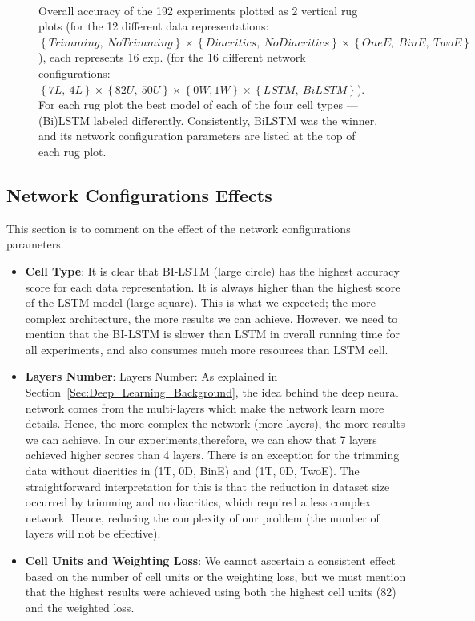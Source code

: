 {\begin{figure}[!t]
 
 \caption{Overall accuracy of the 192 experiments plotted as 2 vertical rug plots (for the 12 different data representations: $\left\{\mathit{Trimming},\ \mathit{No Trimming} \right\} \times \left\{\mathit{Diacritics},\ \mathit{No Diacritics} \right\} \times \left\{\mathit{OneE},\ \mathit{BinE},\ \mathit{TwoE}\right\}$), each represents 16 exp. (for the 16 different network configurations: $\left\{7L,\ 4L\right\} \times \left\{82U,\ 50U\right\} \times \left\{0W, 1W\right\} \times \left\{LSTM,\ BiLSTM\right\}$). For each rug plot the best model of each of the four cell types ---(Bi)LSTM labeled differently. Consistently, BiLSTM was the winner, and its network configuration parameters are listed at the top of each rug plot.}~\label{Fig:ArabicModelsResults}
\end{figure}



\subsection{Network Configurations Effects}

This section is to comment on the effect of the network configurations parameters.
\begin{itemize}

\item \textbf{Cell Type}: It is clear that BI-LSTM (large circle) has the highest accuracy score for each data representation. It is always higher than the highest score of the LSTM model (large square). This is what we expected; the more complex architecture, the more results we can achieve. However, we need to mention that the BI-LSTM is slower than LSTM in overall running time for all experiments, and also consumes much more resources than LSTM cell.
\item \textbf{Layers Number}: Layers Number: As explained in Section~\ref{Sec:Deep_Learning_Background}, the idea behind the deep neural network comes from the multi-layers which make the network learn more details. Hence, the more complex the network (more layers), the more results we can achieve. In our experiments,therefore, we can show that 7 layers achieved higher scores than 4 layers. There is an exception for the trimming data without diacritics in (1T, 0D, BinE) and (1T, 0D, TwoE). The straightforward interpretation for this is that the reduction in dataset size occurred by trimming and no diacritics, which required a less complex network. Hence, reducing the complexity of our problem (the number of layers will not be effective).
\item \textbf{Cell Units and Weighting Loss}: We cannot ascertain a consistent effect based on the number of cell units or the weighting loss, but we must mention that the highest results were achieved using both the highest cell units (82) and the weighted loss.


\end{itemize}}
